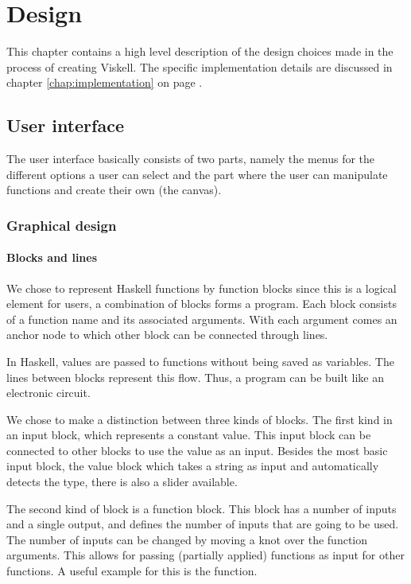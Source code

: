 \chapter{Design}

This chapter contains a high level description of the design choices made in the process of creating Viskell.
The specific implementation details are discussed in chapter \ref{chap:implementation} on page \pageref{chap:implementation}.

\section{User interface}

The user interface basically consists of two parts, namely the menus for the different options a user can select and the part where the user can manipulate functions and create their own (the \gls{canvas}). 

\subsection{Graphical design}

\subsubsection{Blocks and lines}

We chose to represent Haskell functions by function blocks since this is a logical element for users, a combination of blocks forms a program.
Each block consists of a function name and its associated arguments. With each argument comes an anchor node to which other block can be connected through lines.

In Haskell, values are passed to functions without being saved as variables.
The lines between blocks represent this flow.
Thus, a program can be built like an electronic circuit.

We chose to make a distinction between three kinds of blocks.
The first kind in an input block, which represents a constant value.  
This input block can be connected to other blocks to use the value as an input.
Besides the most basic input block, the value block which takes a string as input and automatically detects the type, there is also a slider available. 

The second kind of block is a function block. This block has a number of inputs and a single output, and defines the number of inputs that are going to be used. 
The number of inputs can be changed by moving a knot over the function arguments.
This allows for passing (partially applied) functions as input for other functions. 
A useful example for this is the  function.

